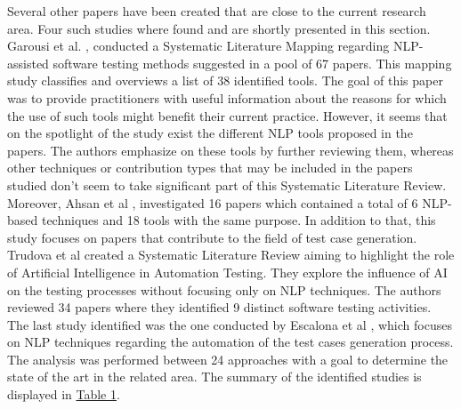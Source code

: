 Several other papers have been created that are close to the current research area. Four such studies where found \cite{garousi2020nlp,battina2019artificial,ahsan2017comprehensive,escalona2011overview} 
and are shortly presented in this section. Garousi et al. \cite{garousi2020nlp}, conducted a Systematic Literature Mapping regarding NLP-assisted software testing methods suggested in a pool 
of 67 papers. This mapping study classifies and overviews a list of 38 identified tools. The goal of this paper was to provide practitioners with useful information about the reasons for which 
the use of such tools might benefit their current practice. However, it seems that on the spotlight of the study exist the different NLP tools proposed in the papers. The authors emphasize on 
these tools by further reviewing them, whereas other techniques or contribution types that may be included in the papers studied don't seem to take significant part of this Systematic Literature 
Review. Moreover, Ahsan et al \cite{ahsan2017comprehensive}, investigated 16 papers which contained a total of 6 NLP-based techniques and 18 tools with the same purpose. In addition to that, this 
study focuses on papers that contribute to the field of test case generation.\\

Trudova et al \cite{battina2019artificial} created a Systematic Literature Review aiming to highlight the role of Artificial Intelligence in Automation Testing. 
They explore the influence of AI on the testing processes without focusing only on NLP techniques. The authors reviewed 34 papers where they identified 9 distinct software testing activities. 
The last study identified was the one conducted by Escalona et al \cite{escalona2011overview}, which focuses on NLP techniques regarding the automation of the test cases generation process. 
The analysis was performed between 24 approaches with a goal to determine the state of the art in the related area. The summary of the identified studies is displayed in \hyperref[table1]{Table 1}. \\

